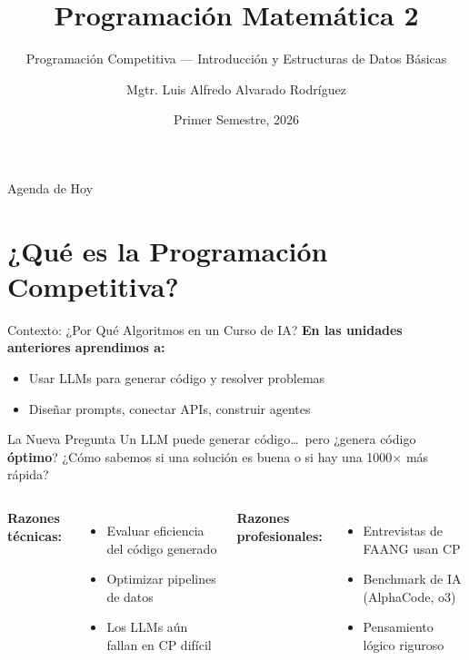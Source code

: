 \documentclass[aspectratio=169]{beamer}
\title[PM2]{Programación Matemática 2}
\subtitle{Programación Competitiva --- Introducción y Estructuras de Datos Básicas}
\author[Luis Alfredo Alvarado]{Mgtr. Luis Alfredo Alvarado Rodríguez}
\institute[ECFM - USAC]{
    Escuela de Ciencias Físicas y Matemáticas \\
    Universidad de San Carlos de Guatemala
}
\date{Primer Semestre, 2026}
\begin{document}
\begin{frame}
    \titlepage
\end{frame}
\begin{frame}{Agenda de Hoy}
    \tableofcontents
\end{frame}
\section{¿Qué es la Programación Competitiva?}
\begin{frame}{Contexto: ¿Por Qué Algoritmos en un Curso de IA?}
    \textbf{En las unidades anteriores aprendimos a:}
    \begin{itemize}
        \item Usar LLMs para generar código y resolver problemas
        \item Diseñar prompts, conectar APIs, construir agentes
    \end{itemize}
    
    \vspace{0.3cm}
    \begin{block}{La Nueva Pregunta}
        Un LLM puede generar código\ldots\ pero ¿genera código \textbf{óptimo}? ¿Cómo sabemos si una solución es buena o si hay una 1000$\times$ más rápida?
    \end{block}
    
    \vspace{0.3cm}
    \begin{columns}[t]
        \textbf{Razones técnicas:}
        \begin{itemize}
            \item Evaluar eficiencia del código generado
            \item Optimizar pipelines de datos
            \item Los LLMs aún fallan en CP difícil
        \end{itemize}
        
        \textbf{Razones profesionales:}
        \begin{itemize}
            \item Entrevistas de FAANG usan CP
            \item Benchmark de IA (AlphaCode, o3)
            \item Pensamiento lógico riguroso
        \end{itemize}
    \end{columns}
\end{frame}
\end{document}
